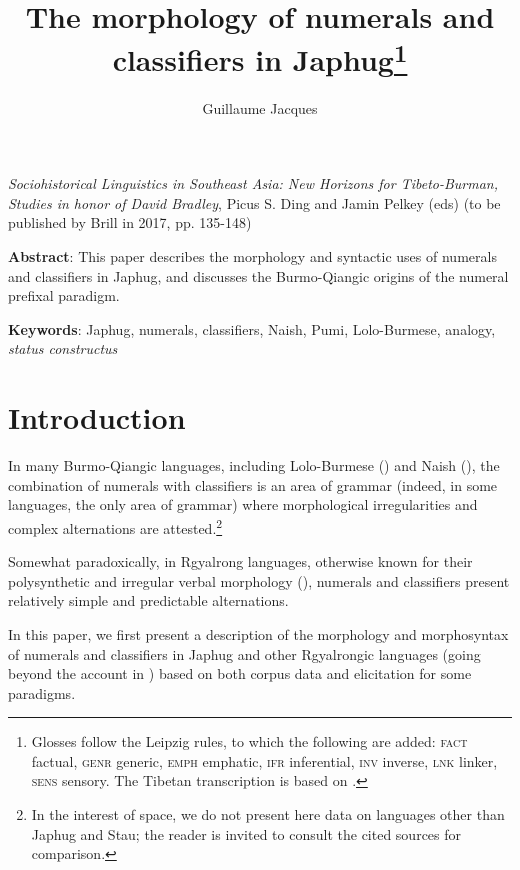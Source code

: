 \documentclass[oldfontcommands,oneside,a4paper,12pt]{article}
\begin{document}
\title{The morphology of numerals and classifiers in Japhug\footnote{Glosses follow the Leipzig rules, to which the following are added:  \textsc{fact} factual, \textsc{genr} generic,   \textsc{emph} emphatic, \textsc{ifr} inferential, \textsc{inv} inverse, \textsc{lnk} linker, \textsc{sens} sensory. The Tibetan transcription is based on \citet{jacques12transcription}.} }
\author{Guillaume Jacques}
\maketitle

\sloppy
\textit{Sociohistorical Linguistics in Southeast Asia: New Horizons for Tibeto-Burman, Studies in honor of David Bradley}, Picus S. Ding and Jamin Pelkey (eds) (to be published by Brill in 2017, pp. 135-148)

\textbf{Abstract}: This paper describes the morphology and syntactic uses of numerals and classifiers in Japhug, and discusses the Burmo-Qiangic origins of the numeral prefixal paradigm.

\textbf{Keywords}: Japhug, numerals, classifiers, Naish, Pumi, Lolo-Burmese, analogy, \textit{status constructus}



\section{Introduction}
In many Burmo-Qiangic languages, including Lolo-Burmese (\citealt{bradley05numerals}) and Naish (\citealt{michaud11cl, michaud13numeral}), the combination of numerals with classifiers is an area of grammar (indeed, in some languages, the only area of grammar) where
morphological irregularities and complex alternations are attested.\footnote{In the interest of space, we do not present here data on languages other than Japhug and Stau; the reader is invited to consult the cited sources for comparison.}

Somewhat paradoxically, in Rgyalrong languages, otherwise known for their polysynthetic and irregular verbal morphology (\citealt{jackson14morpho, jacques12incorp}), numerals and classifiers present relatively simple and predictable alternations. 

In this paper, we first present a  description of the morphology and morphosyntax of numerals and classifiers in Japhug and other Rgyalrongic  languages (going beyond the account in   \citealt{jacques08}) based on both corpus data and elicitation for some paradigms. 
\end{document}
